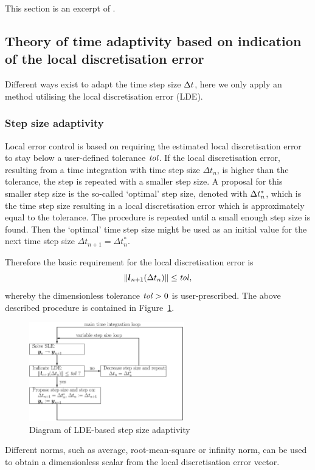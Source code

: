 This section is an excerpt of \cite{strdyn:bornemann03}.

\subsection{Theory of time adaptivity based on indication of the local discretisation error}
Different ways exist to adapt the time step size $\Delta t$, here we only apply an  method utilising the local discretisation error (LDE). 

\subsubsection{Step size adaptivity} \label{strdyn:sec:adaptivity}
Local error control is based on requiring the estimated local
discretisation error to stay below a user-defined tolerance
$\mathit{tol}$\@. If the local discretisation error, resulting from a time integration with time
step size $\Delta t_n$, is higher than the tolerance, the step is
repeated with a smaller step size. A proposal for this smaller step size is the so-called `optimal' step size, denoted with $\Delta t_n^*$, which
is the time step size resulting in a local discretisation error which is approximately equal to the
tolerance. The procedure is repeated until a small enough step size is
found. Then the `optimal' time step size might be used as an initial value
for the next time step size $\Delta t_{n+1} = \Delta t_n^*$\@. 

Therefore the basic requirement for the local discretisation error is
\begin{equation} \label{strdyn:eq:lde-leq-tol}
  \|\boldsymbol{l}_{n+1}(\Delta t_n)\| \leq \mathit{tol}
  \text{,}
\end{equation}
whereby the dimensionless tolerance $\mathit{tol}>0$ is user-prescribed. The above
described procedure is contained in 
Figure~\ref{strdyn:fig:adap-sch}\@. 
\begin{figure}[ht!]
\begin{center}
\includegraphics[width=0.6\textwidth]{gfx/adap-sch}
\caption{Diagram of LDE-based step size adaptivity}
\label{strdyn:fig:adap-sch}
\end{center}
\end{figure}
Different norms, such as 
average, root-mean-square or infinity norm, can be used to obtain a
dimensionless scalar from the local discretisation error vector.

